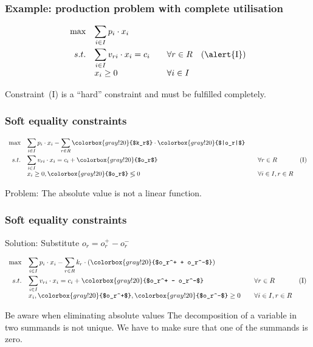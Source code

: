 \begin{frame}
 \frametitle{Example: production problem with complete utilisation}
 \begin{equation*}
  \begin{array}{rllr}
    \max & \displaystyle\sum_{i\in I} p_i\cdot x_i & & \\[3ex]
    s.t. & \displaystyle\sum_{i\in I} v_{ri}\cdot x_i = c_i & \quad\forall r\in R & \mathrm{(\alert{I})}\\
	  & x_i \geq 0 & \quad\forall i\in I & \\
  \end{array}
 \end{equation*}
 
 Constraint~\textrm{(\alert{I})} is a ``hard'' constraint and must be fulfilled completely.
\end{frame}

\begin{frame}
 \frametitle{Soft equality constraints}
  \begin{equation*}
    \begin{array}{rllr}
      \max & \displaystyle\sum_{i\in I} p_i\cdot x_i - \sum_{r\in R} \colorbox{gray!20}{$k_r$} \cdot \colorbox{gray!20}{$|o_r|$} & & \\[3ex]
      s.t. & \displaystyle\sum_{i\in I} v_{ri}\cdot x_i = c_i + \colorbox{gray!20}{$o_r$} & \quad\forall r\in R & \mathrm{(I)}\\
	    & x_i \geq 0, \colorbox{gray!20}{$o_r$} \lessgtr0 & \quad\forall i\in I, r\in R & \\
    \end{array}
  \end{equation*}
 
 Problem: The absolute value is not a linear function.
\end{frame}

\begin{frame}
 \frametitle{Soft equality constraints}
  Solution: Substitute $o_r = o_r^+ - o_r^-$
  
  \begin{equation*}
    \begin{array}{rllr}
      \max & \displaystyle\sum_{i\in I} p_i\cdot x_i - \sum_{r\in R} k_r \cdot (\colorbox{gray!20}{$o_r^+ + o_r^-$}) & & \\[3ex]
      s.t. & \displaystyle\sum_{i\in I} v_{ri}\cdot x_i = c_i + \colorbox{gray!20}{$o_r^+ - o_r^-$} & \quad\forall r\in R & \mathrm{(I)}\\
	    & x_i, \colorbox{gray!20}{$o_r^+$}, \colorbox{gray!20}{$o_r^-$} \geq 0 & \quad\forall i\in I, r\in R & \\
    \end{array}
  \end{equation*}
  
  \begin{alertblock}{Be aware when eliminating absolute values}
   The decomposition of a variable in two summands is not unique. We have to make sure that one of the summands is zero.
  \end{alertblock}
\end{frame}

